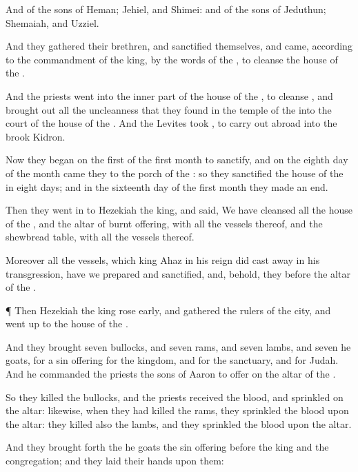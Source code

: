 {And of the
sons of
Heman;
Jehiel, and
Shimei: and of the
sons of
Jeduthun;
Shemaiah, and
Uzziel.

And they
gathered their
brethren, and
sanctified themselves, and
came, according to the
commandment of the
king, by the
words of the
{}, to
cleanse the
house of the
{}.

And the
priests
went into the inner
part of the
house of the
{}, to
cleanse
{}, and brought
out all the
uncleanness that they
found in the
temple of the
{} into the
court of the
house of the
{}. And the
Levites
took
{}, to carry
{}
out
abroad into the
brook
Kidron.

Now they
began on the
first
{} of the
first
month to
sanctify, and on the
eighth
day of the
month
came they to the
porch of the
{}: so they
sanctified the
house of the
{} in
eight
days; and in the
sixteenth day of the
first
month they made an
end.

Then they
went
in to
Hezekiah the
king, and
said, We have
cleansed all the
house of the
{}, and the
altar of burnt
offering, with all the
vessels thereof, and the
shewbread
table, with all the
vessels thereof.

Moreover all the
vessels, which
king
Ahaz in his
reign did cast
away in his
transgression, have we
prepared and
sanctified, and, behold, they
{}
before the
altar of the
{}.


\par }{\PP {}¶ Then
Hezekiah the
king rose
early, and
gathered the
rulers of the
city, and went
up to the
house of the
{}.

And they
brought
seven
bullocks, and
seven
rams, and
seven
lambs, and
seven
he
goats, for a sin
offering for the
kingdom, and for the
sanctuary, and for
Judah. And he
commanded the
priests the
sons of
Aaron to
offer
{} on the
altar of the
{}.

So they
killed the
bullocks, and the
priests
received the
blood, and
sprinkled
{} on the
altar: likewise, when they had
killed the
rams, they
sprinkled the
blood upon the
altar: they
killed also the
lambs, and they
sprinkled the
blood upon the
altar.

And they brought
forth the he
goats
{} the sin
offering
before the
king and the
congregation; and they
laid their
hands upon them:

}
